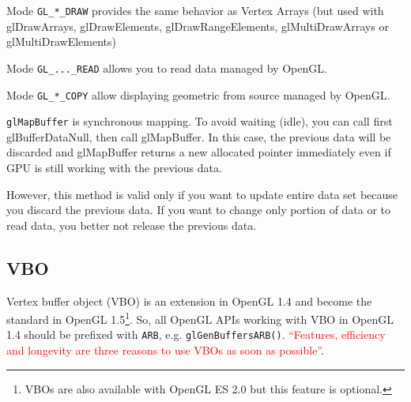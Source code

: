 \begin{framed}
  Mode \verb!GL_*_DRAW! provides the same behavior as Vertex Arrays
  (but used with glDrawArrays, glDrawElements, glDrawRangeElements,
  glMultiDrawArrays or glMultiDrawElements)

  Mode \verb!GL_..._READ!  allows you to read data managed by OpenGL.

  Mode \verb!GL_*_COPY!  allow displaying geometric from source
  managed by OpenGL.
\end{framed}



\begin{framed}
  \verb!glMapBuffer! is synchronous mapping.  To avoid waiting (idle),
  you can call first glBufferDataNull, then call glMapBuffer. In this
  case, the previous data will be discarded and glMapBuffer returns a
  new allocated pointer immediately even if GPU is still working with
  the previous data.

  However, this method is valid only if you want to update entire data
  set because you discard the previous data. If you want to change
  only portion of data or to read data, you better not release the
  previous data.

\end{framed}


\subsection{VBO}
\label{sec:vbo}

Vertex buffer object (VBO) is an extension in OpenGL 1.4 and become
the standard in OpenGL
1.5\footnote{ VBOs are also available with OpenGL ES 2.0 but this
  feature is optional.}.
So, all OpenGL APIs working with VBO in OpenGL 1.4 should be prefixed
with \verb!ARB!, e.g. \verb!glGenBuffersARB()!.
\textcolor{red}{``Features, efficiency and longevity are three reasons
  to use VBOs as soon as possible''}.

